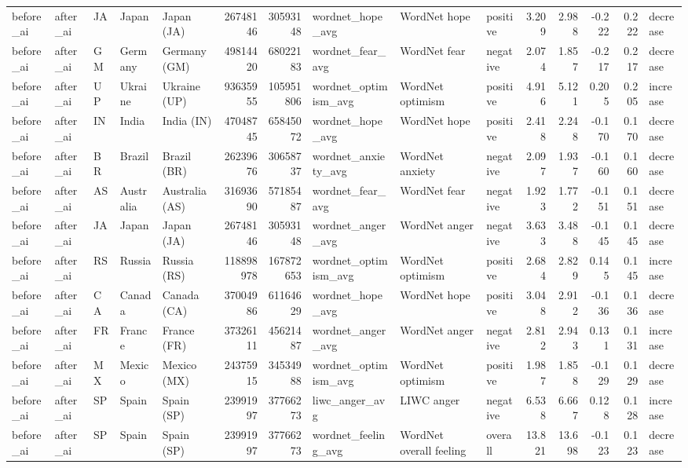 \begin{tabular}{lllllrrlllrrrrl}
before\_ai & after\_ai & JA & Japan & Japan (JA) & 26748146 & 30593148 & wordnet\_hope\_avg & WordNet hope & positive & 3.209 & 2.988 & -0.222 & 0.222 & decrease \\
before\_ai & after\_ai & GM & Germany & Germany (GM) & 49814420 & 68022183 & wordnet\_fear\_avg & WordNet fear & negative & 2.074 & 1.857 & -0.217 & 0.217 & decrease \\
before\_ai & after\_ai & UP & Ukraine & Ukraine (UP) & 93635955 & 105951806 & wordnet\_optimism\_avg & WordNet optimism & positive & 4.916 & 5.121 & 0.205 & 0.205 & increase \\
before\_ai & after\_ai & IN & India & India (IN) & 47048745 & 65845072 & wordnet\_hope\_avg & WordNet hope & positive & 2.418 & 2.248 & -0.170 & 0.170 & decrease \\
before\_ai & after\_ai & BR & Brazil & Brazil (BR) & 26239676 & 30658737 & wordnet\_anxiety\_avg & WordNet anxiety & negative & 2.097 & 1.937 & -0.160 & 0.160 & decrease \\
before\_ai & after\_ai & AS & Australia & Australia (AS) & 31693690 & 57185487 & wordnet\_fear\_avg & WordNet fear & negative & 1.923 & 1.772 & -0.151 & 0.151 & decrease \\
before\_ai & after\_ai & JA & Japan & Japan (JA) & 26748146 & 30593148 & wordnet\_anger\_avg & WordNet anger & negative & 3.633 & 3.488 & -0.145 & 0.145 & decrease \\
before\_ai & after\_ai & RS & Russia & Russia (RS) & 118898978 & 167872653 & wordnet\_optimism\_avg & WordNet optimism & positive & 2.684 & 2.829 & 0.145 & 0.145 & increase \\
before\_ai & after\_ai & CA & Canada & Canada (CA) & 37004986 & 61164629 & wordnet\_hope\_avg & WordNet hope & positive & 3.048 & 2.912 & -0.136 & 0.136 & decrease \\
before\_ai & after\_ai & FR & France & France (FR) & 37326111 & 45621487 & wordnet\_anger\_avg & WordNet anger & negative & 2.812 & 2.943 & 0.131 & 0.131 & increase \\
before\_ai & after\_ai & MX & Mexico & Mexico (MX) & 24375915 & 34534988 & wordnet\_optimism\_avg & WordNet optimism & positive & 1.987 & 1.858 & -0.129 & 0.129 & decrease \\
before\_ai & after\_ai & SP & Spain & Spain (SP) & 23991997 & 37766273 & liwc\_anger\_avg & LIWC anger & negative & 6.538 & 6.667 & 0.128 & 0.128 & increase \\
before\_ai & after\_ai & SP & Spain & Spain (SP) & 23991997 & 37766273 & wordnet\_feeling\_avg & WordNet overall feeling & overall & 13.821 & 13.698 & -0.123 & 0.123 & decrease \\

\end{tabular}
